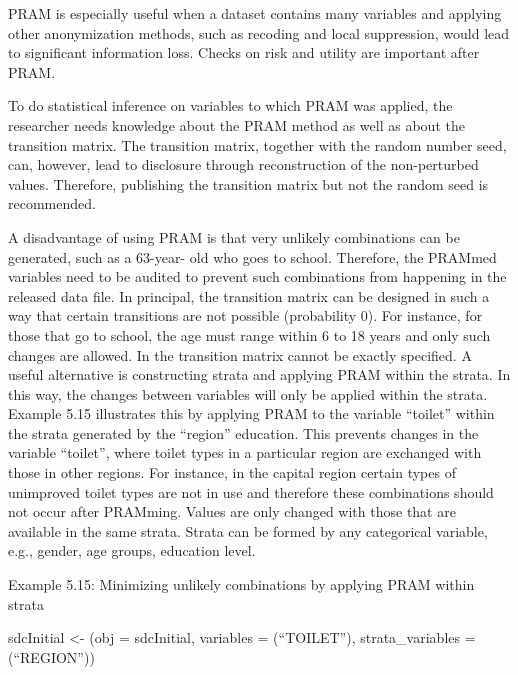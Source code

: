 \documentclass[letterpaper,10pt,english]{sphinxmanual}
\begin{document}
PRAM is especially useful when a dataset contains many variables and
applying other anonymization methods, such as recoding and local
suppression, would lead to significant information loss. Checks on risk
and utility are important after PRAM.

To do statistical inference on variables to which PRAM was applied, the
researcher needs knowledge about the PRAM method as well as about the
transition matrix. The transition matrix, together with the random
number seed, can, however, lead to disclosure through reconstruction of
the non-perturbed values. Therefore, publishing the transition matrix
but not the random seed is recommended.

A disadvantage of using PRAM is that very unlikely combinations can be
generated, such as a 63-year- old who goes to school. Therefore, the
PRAMmed variables need to be audited to prevent such combinations from
happening in the released data file. In principal, the transition matrix
can be designed in such a way that certain transitions are not possible
(probability 0). For instance, for those that go to school, the age must
range within 6 to 18 years and only such changes are allowed. In
 the transition matrix cannot be exactly specified. A useful
alternative is constructing strata and applying PRAM within the strata.
In this way, the changes between variables will only be applied within
the strata. Example 5.15 illustrates this by applying PRAM to the
variable “toilet” within the strata generated by the “region” education.
This prevents changes in the variable “toilet”, where toilet types in a
particular region are exchanged with those in other regions. For
instance, in the capital region certain types of unimproved toilet types
are not in use and therefore these combinations should not occur after
PRAMming. Values are only changed with those that are available in the
same strata. Strata can be formed by any categorical variable, e.g.,
gender, age groups, education level.

Example 5.15: Minimizing unlikely combinations by applying PRAM within
strata

\begin{DUlineblock}{0em}
\item[] 
\item[] sdcInitial \textless{}- (obj = sdcInitial, variables =
(“TOILET”), strata\_variables = (“REGION”))
\end{DUlineblock}
\end{document}

